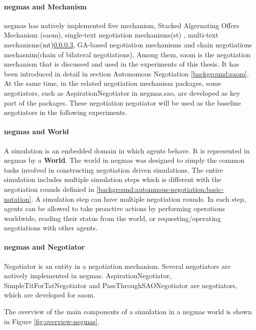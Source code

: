 \paragraph{\gls{negmas} and Mechanism}
\gls{negmas} has natively implemented five mechanism, Stacked Algernating Offers Mechanism (\gls{saom}), single-text negotiation mechanisms(st) \parencite{raiffa1982art}, multi-text mechanisms(mt)\ref{}, GA-based negotiation mechanisms\parencite{2015effects} and chain negotiations mechasnim(chain of bilateral negotiations). Among them, \gls{saom} is the negotiation mechanism that is discussed and used in the experiments of this thesis. It has been introduced in detail in section Autonomous Negotiation \ref{background:saom}. At the same time, in the related negotiation mechanism packages, some negotiators, such as AspirationNegotiator in negmas.sao, are developed as key part of the packages. These negotiation negotiator will be used as the baseline negotiators in the following experiments.
\paragraph{\gls{negmas} and World}
A simulation is an embedded domain in which agents behave. It is represented in \gls{negmas} by a \textbf{World}. The world in \gls{negmas} was designed to simply the common tasks involved in constructing negotiation driven simulations\parencite{Mohammad2019}. The entire simulation includes multiple simulation steps which is different with the negotiation rounds definied in \ref{background:autonmous-negotiation:basic-notation}. A simulation step can have multiple negotiation rounds. In each step, agents can be allowed to take proactive actions by performing operations worldwide, reading their status from the world, or requesting/operating negotiations with other agents.
\paragraph{\gls{negmas} and Negotiator} Negotiator is an entity in a negotiation mechanism. Several negotiators are natively implemented in \gls{negmas}. AspirationNegotiator, SimpleTitForTatNegotiator and PassThroughSAONegotiator are negotiators, which are developed for \gls{saom}.

The overview of the main components of a simulation in a \gls{negmas} world is shown in Figure \ref{fig:overview-negmas}.

